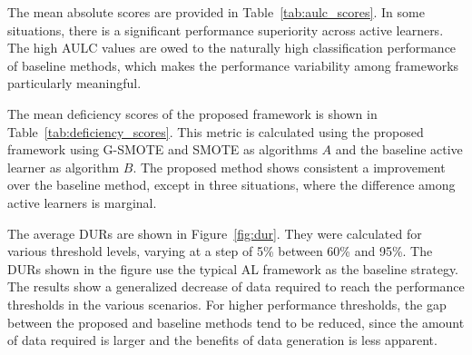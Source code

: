 \documentclass[parskip=full]{scrartcl}
\begin{document}

The mean absolute scores are provided in Table~\ref{tab:aulc_scores}. In some
situations, there is a significant performance superiority across active
learners. The high AULC values are owed to the naturally high classification
performance of baseline methods, which makes the performance variability among
frameworks particularly meaningful. 


The mean deficiency scores of the proposed framework is shown in
Table~\ref{tab:deficiency_scores}. This metric is calculated using the proposed
framework using G-SMOTE and SMOTE as algorithms $A$ and the baseline active
learner as algorithm $B$. The proposed method shows consistent a improvement
over the baseline method, except in three situations, where the difference among
active learners is marginal.


The average DURs are shown in Figure~\ref{fig:dur}. They were calculated for
various threshold levels, varying at a step of 5\% between 60\% and
95\%. The DURs shown in the figure use the typical AL framework as the baseline
strategy. The results show a generalized decrease of data required to reach the
performance thresholds in the various scenarios. For higher performance
thresholds, the gap between the proposed and baseline methods tend to be
reduced, since the amount of data required is larger and the benefits of data
generation is less apparent.
\end{document}
